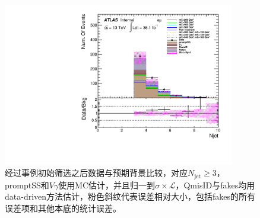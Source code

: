 \begin{figure}[h]
\begin{minipage}[t]{0.33\linewidth}
\end{minipage}
\begin{minipage}[t]{0.33\linewidth}
\centering
\includegraphics[width=0.9\textwidth,angle=-90]{fig/dataMC_high_Njet_CR/numOfjet_emu.pdf}
\end{minipage} 
\caption{经过事例初始筛选之后数据与预期背景比较，对应$N_{\text{jet}}\geq3$，promptSS和$V\gamma$使用MC估计，并且归一到$\sigma\times\mathcal{L}$，QmisID与fakes均用data-driven方法估计，粉色斜纹代表误差相对大小，包括fakes的所有误差项和其他本底的统计误差。}
\label{fig:dataMC_high_Njet_CR:numOfjet}
\end{figure}
